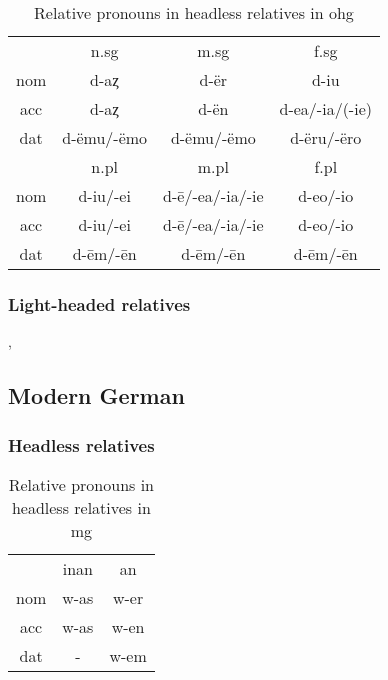 \begin{table}[H]\label{tbl:paradigmohg}
	\center
	\caption {Relative pronouns in headless relatives in \ac{ohg}}
		\begin{tabular}{cccc}
		\toprule
							& \ac{n}.\ac{sg}	& \ac{m}.\ac{sg}  & \ac{f}.\ac{sg}	\\
								\cmidrule{2-4}
		\ac{nom}	& d-aȥ          	& d-ër       			& d-iu						\\
		\ac{acc}	& d-aȥ   					& d-ën						& d-ea/-ia/(-ie)	\\
		\ac{dat}	& d-ëmu/-ëmo	    & d-ëmu/-ëmo			& d-ëru/-ëro			\\
		\bottomrule
	    				& \ac{n}.\ac{pl}	& \ac{m}.\ac{pl}  	& \ac{f}.\ac{pl}	\\
	    					\cmidrule{2-4}
    \ac{nom} 	& d-iu/-ei   			&  d-ē/-ea/-ia/-ie	& d-eo/-io        \\
    \ac{acc} 	& d-iu/-ei   			&  d-ē/-ea/-ia/-ie	& d-eo/-io        \\
    \ac{dat} 	& d-ēm/-ēn   			&  d-ēm/-ēn       	& d-ēm/-ēn        \\
    \bottomrule
		\end{tabular}
\end{table}

\subsubsection{Light-headed relatives}

, 





\subsection{Modern German}

\subsubsection{Headless relatives}


\begin{table}[H]
	\center
	\caption {Relative pronouns in headless relatives in \ac{mg}}
		\begin{tabular}{ccc}
		\toprule
							& \ac{inan}	& \ac{an}	\\
								\cmidrule{2-3}
    \ac{nom} 	& w-as    	& w-er   	\\
    \ac{acc} 	& w-as    	& w-en  	\\
    \ac{dat} 	& -  				& w-em   	\\
		\bottomrule
		\end{tabular}
\end{table}

